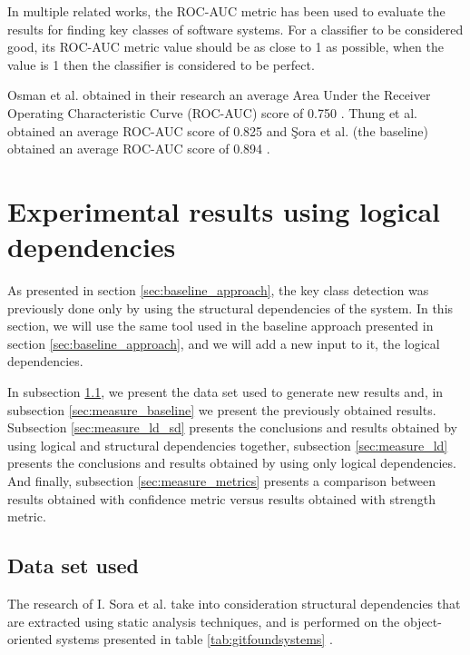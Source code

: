 \documentclass[runningheads]{comsis2}
\begin{document}
In multiple related works, the ROC-AUC metric has been used to evaluate the results for finding key classes of software systems.
For a classifier to be considered good, its ROC-AUC metric value should be as close to 1 as possible, when the value is 1 then the classifier is considered to be perfect.

Osman et al. obtained in their research an average Area Under the Receiver Operating Characteristic Curve (ROC-AUC) score of 0.750 \cite{6676885}. Thung et al. obtained an average ROC-AUC score of 0.825 \cite{rocclasification}  and Şora et al. (the baseline) obtained an average ROC-AUC score of 0.894 \cite{Finding-key-classes}.



\section{Experimental results using logical dependencies}
\label{sec:current_measurements}


As presented in section \ref{sec:baseline_approach}, the key class detection was previously done only by using the structural dependencies of the system. 
In this section, we will use the same tool used in the baseline approach presented in section \ref{sec:baseline_approach}, and we will add a new input to it, the logical dependencies. 

In subsection \ref{sec:dataset}, we present the data set used to generate new results and, in subsection \ref{sec:measure_baseline} we present the previously obtained results. Subsection \ref{sec:measure_ld_sd} presents the conclusions and results obtained by using logical and structural dependencies together, subsection \ref{sec:measure_ld} presents the conclusions and results obtained by using only logical dependencies. And finally, subsection \ref{sec:measure_metrics} presents a comparison between results obtained with confidence metric versus results obtained with strength metric.



\subsection{Data set used}
\label{sec:dataset}


The research of I. Sora et al. take into consideration structural dependencies that are extracted using static analysis techniques, and is performed on the object-oriented systems presented in table \ref{tab:gitfoundsystems} \cite{Finding-key-classes}.
\end{document}
